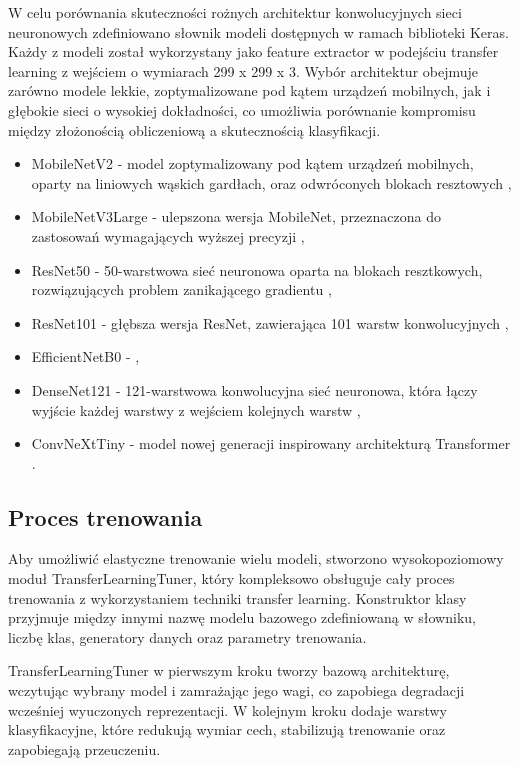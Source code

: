 W celu porównania skuteczności rożnych architektur konwolucyjnych sieci neuronowych zdefiniowano słownik modeli dostępnych w ramach biblioteki Keras.
Każdy z modeli został wykorzystany jako feature extractor w podejściu transfer learning z wejściem o wymiarach 299 x 299 x 3.
Wybór architektur obejmuje zarówno modele lekkie, zoptymalizowane pod kątem urządzeń mobilnych, jak i głębokie sieci o wysokiej dokładności, co umożliwia porównanie kompromisu między złożonością obliczeniową a skutecznością klasyfikacji.

\begin{itemize}
	\item MobileNetV2 - model zoptymalizowany pod kątem urządzeń mobilnych, oparty na liniowych wąskich gardłach, oraz odwróconych blokach resztowych \cite{sandler2019mobilenetv2invertedresidualslinear},
	\item MobileNetV3Large - ulepszona wersja MobileNet, przeznaczona do zastosowań wymagających wyższej precyzji \cite{howard2019searchingmobilenetv3},
	\item ResNet50 - 50-warstwowa sieć neuronowa oparta na blokach resztkowych, rozwiązujących problem zanikającego gradientu \cite{he2015deepresiduallearningimage},
	\item ResNet101 - głębsza wersja ResNet, zawierająca 101 warstw konwolucyjnych \cite{he2015deepresiduallearningimage},
	\item EfficientNetB0 - \cite{tan2020efficientnetrethinkingmodelscaling},
	\item DenseNet121 - 121-warstwowa konwolucyjna sieć neuronowa, która łączy wyjście każdej warstwy z wejściem kolejnych warstw \cite{huang2018denselyconnectedconvolutionalnetworks},
	\item ConvNeXtTiny - model nowej generacji inspirowany architekturą Transformer \cite{liu2022convnet2020s}.
\end{itemize}

\subsection{Proces trenowania}
Aby umożliwić elastyczne trenowanie wielu modeli, stworzono wysokopoziomowy moduł TransferLearningTuner, który kompleksowo obsługuje cały proces trenowania z wykorzystaniem techniki transfer learning.
Konstruktor klasy przyjmuje między innymi nazwę modelu bazowego zdefiniowaną w słowniku, liczbę klas, generatory danych oraz parametry trenowania.

TransferLearningTuner w pierwszym kroku tworzy bazową architekturę, wczytując wybrany model i zamrażając jego wagi, co zapobiega degradacji wcześniej wyuczonych reprezentacji.
W kolejnym kroku dodaje warstwy klasyfikacyjne, które redukują wymiar cech, stabilizują trenowanie oraz zapobiegają przeuczeniu.

